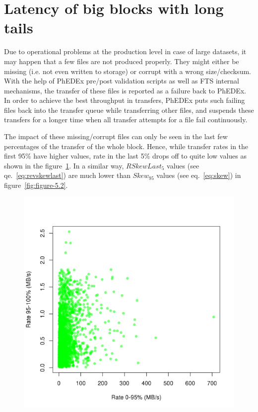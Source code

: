 \section{Latency of big blocks with long tails}

Due to operational problems at the production level in case of large
datasets, it may happen that a few files are not produced
properly. They might either be missing (i.e. not even written to
storage) or corrupt with a wrong size/checksum. With the help of
PhEDEx pre/post validation scripts as well as FTS internal mechanisms,
the transfer of these files is reported as a failure back to
PhEDEx. In order to achieve the best throughput in transfers, PhEDEx
puts such failing files back into the transfer queue while
transferring other files, and suspends these transfers for a longer
time when all transfer attempts for a file fail continuously.

The impact of these missing/corrupt files can only be seen in the last
few percentages of the transfer of the whole block. Hence, while
transfer rates in the first 95\% have higher values, rate in the last
5\% drops off to quite low values as shown in the
figure~\ref{fig:figure-5.1}. In a similar way, $RSkewLast_5$
values (see qe.~\ref{eq:revskewlast}) are much lower than
$Skew_{95}$ values (see eq.~\ref{eq:skew}) in
figure~\ref{fig:figure-5.2}.

\begin{figure}[htp]
\centering
\includegraphics{Figures/figure-51.pdf}
\caption{}\label{fig:figure-5.1}
\end{figure}


